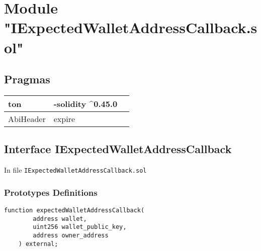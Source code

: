 
\section{Module "IExpectedWalletAddressCallback.sol"}


\subsection{Pragmas}


\noindent\begin{tabular}{|l|l|p{5cm}|}\hline
ton & -solidity \^{}0.45.0 &\\\hline
AbiHeader &  expire &\\\hline
\end{tabular}


\subsection{Interface IExpectedWalletAddressCallback}


In file {\tt IExpectedWalletAddressCallback.sol}

\subsubsection{Prototypes Definitions}

\vspace{2cm}

\begin{lstlisting}[firstnumber=5]
    function expectedWalletAddressCallback(
        address wallet,
        uint256 wallet_public_key,
        address owner_address
    ) external;
\end{lstlisting}
